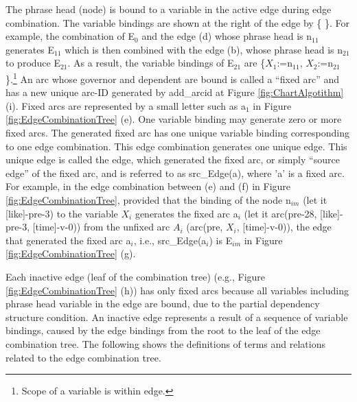 \documentclass[english]{jnlp_1.4_rep}
\theoremstyle{break}
\theoremstyle{plain}
\theoremstyle{plain}
\begin{document}
The phrase head (node) is bound to a variable in the active edge
during edge combination. The variable bindings are shown at the right
of the edge by \{ \}. For example, the combination of E$_0$ and the
edge (d) whose phrase head is n$_{11}$ generates E$_{11}$ which is
then combined with the edge (b), whose phrase head is n$_{21}$ to
produce E$_{21}$. As a result, the variable bindings of E$_{21}$ are
\{$X_1$:=n$_{11}$, $X_2$:=n$_{21}$\}.\footnote{Scope of a variable is
  within edge. } An arc whose governor and dependent are bound is
called a ``fixed arc'' and has a new unique arc-ID generated by
add\_arcid at Figure \ref{fig:ChartAlgotithm} (i).  Fixed arcs are
represented by a small letter such as a$_1$ in
Figure \ref{fig:EdgeCombinationTree} (e). One variable binding may
generate zero or more fixed arcs. The generated fixed arc has one
unique variable binding corresponding to one edge combination. This
edge combination generates one unique edge. This unique edge is called
the edge, which generated the fixed arc, or simply ``source edge'' of
the fixed arc, and is referred to as src\_Edge(a), where 'a' is a fixed
arc. For example, in the edge combination between (e) and (f) in
Figure \ref{fig:EdgeCombinationTree}, provided that the binding of the
node n$_{im}$ (let it [like]-pre-3) to the variable $X_i$ generates
the fixed arc a$_i$ (let it arc(pre-28, [like]-pre-3, [time]-v-0))
from the unfixed arc $A_i$ (arc(pre, $X_i$, [time]-v-0)), the edge
that generated the fixed arc a$_i$, i.e., src\_Edge(a$_i$) is
E$_{im}$ in Figure \ref{fig:EdgeCombinationTree} (g).

Each inactive edge (leaf of the combination tree)
(e.g., Figure \ref{fig:EdgeCombinationTree} (h)) has only fixed arcs
because all variables including phrase head variable in the edge are
bound, due to the partial dependency structure condition. An inactive edge
represents a result of a sequence of variable bindings, caused by the
edge bindings from the root to the leaf of the edge combination
tree. The following shows the definitions of terms and relations
related to the edge combination tree.
\end{document}
